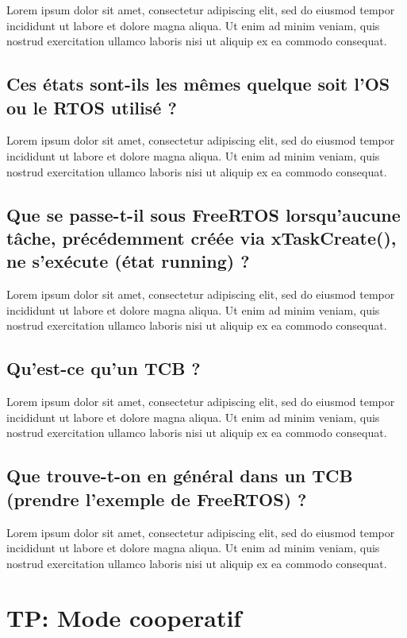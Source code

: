 \documentclass[a4paper]{report}
\begin{document}
Lorem ipsum dolor sit amet, consectetur adipiscing elit, sed do eiusmod tempor
incididunt ut labore et dolore magna aliqua. Ut enim ad minim veniam, quis
nostrud exercitation ullamco laboris nisi ut aliquip ex ea commodo consequat.

\section{Ces états sont-ils les mêmes quelque soit l'OS ou le RTOS utilisé ?}

Lorem ipsum dolor sit amet, consectetur adipiscing elit, sed do eiusmod tempor
incididunt ut labore et dolore magna aliqua. Ut enim ad minim veniam, quis
nostrud exercitation ullamco laboris nisi ut aliquip ex ea commodo consequat.

\section{Que se passe-t-il sous FreeRTOS lorsqu'aucune tâche, précédemment créée via xTaskCreate(), ne s'exécute (état running) ?}

Lorem ipsum dolor sit amet, consectetur adipiscing elit, sed do eiusmod tempor
incididunt ut labore et dolore magna aliqua. Ut enim ad minim veniam, quis
nostrud exercitation ullamco laboris nisi ut aliquip ex ea commodo consequat.

\section{Qu'est-ce qu'un TCB ?}

Lorem ipsum dolor sit amet, consectetur adipiscing elit, sed do eiusmod tempor
incididunt ut labore et dolore magna aliqua. Ut enim ad minim veniam, quis
nostrud exercitation ullamco laboris nisi ut aliquip ex ea commodo consequat.

\section{Que trouve-t-on en général dans un TCB (prendre l'exemple de FreeRTOS) ?}

Lorem ipsum dolor sit amet, consectetur adipiscing elit, sed do eiusmod tempor
incididunt ut labore et dolore magna aliqua. Ut enim ad minim veniam, quis
nostrud exercitation ullamco laboris nisi ut aliquip ex ea commodo consequat.


\chapter*{TP: Mode cooperatif}
\end{document}
